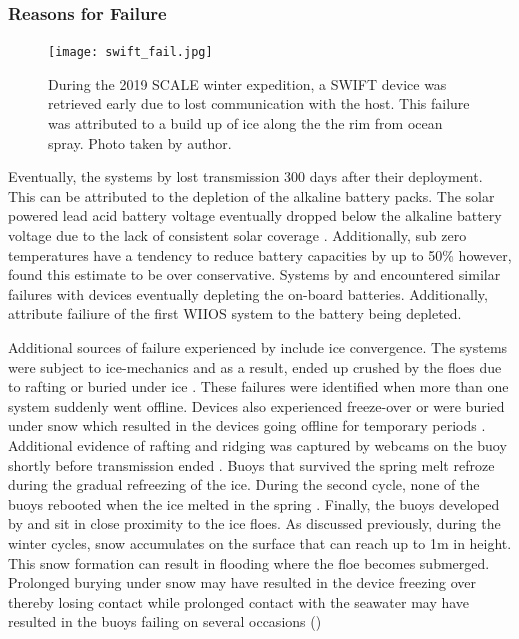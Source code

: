 \subsubsection{Reasons for Failure}
\label{ch2:sec3_failiure}
\begin{figure}[H]
    \centering
    \texttt{[image: swift\_fail.jpg]}
    \caption{During the 2019 SCALE winter expedition, a SWIFT device was retrieved early due to lost communication with the host. This failure was attributed to a build up of ice along the the rim from ocean spray. Photo taken by author.}
    \label{fig:swift_fail}
\end{figure}
Eventually, the systems by \textcite{doble2017robust} lost transmission 300 days after their deployment. This can be attributed to the depletion of the alkaline battery packs. The solar powered lead acid battery voltage eventually dropped below the alkaline battery voltage due to the lack of consistent solar coverage \cite{doble2017robust}. Additionally, sub zero temperatures have a tendency to reduce battery capacities by up to 50\% \cite{doble2017robust} however, \textcite{doble2017robust} found this estimate to be over conservative. Systems by \textcite{kohout2015device} and \textcite{doble2017robust} encountered similar failures with devices eventually depleting the on-board batteries. Additionally, \cite{alberello2019drift} attribute failiure of the first WIIOS system to the battery being depleted.\par 

Additional sources of failure experienced by \textcite{doble2017robust} include ice convergence. The systems were subject to ice-mechanics and as a result, ended up crushed by the floes due to rafting or buried under ice \textcite{doble2017robust}. These failures were identified when more than one system suddenly went offline. Devices also experienced freeze-over or were buried under snow which resulted in the devices going offline for temporary periods \cite{doble2017robust}. Additional evidence of rafting and ridging was captured by webcams on the buoy shortly before transmission ended \cite{doble2017robust}. Buoys that survived the spring melt refroze during the gradual refreezing of the ice. During the second cycle, none of the buoys rebooted when the ice melted in the spring \cite{doble2017robust}. Finally, the buoys developed by \textcite{kohout2015device} and \textcite{rabault2017measurements} sit in close proximity to the ice floes. As discussed previously, during the winter cycles, snow accumulates on the surface that can reach up to 1m in height. This snow formation can result in flooding where the floe becomes submerged. Prolonged burying under snow may have resulted in the device freezing over thereby losing contact while prolonged contact with the seawater may have resulted in the buoys failing on several occasions (\cite{kohout2015device,vichi2019effects,albarello2020drift,rabault2019open})\par 

